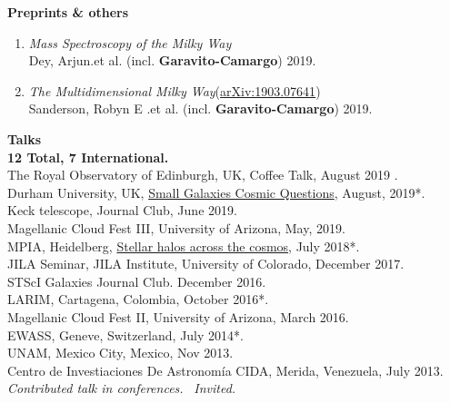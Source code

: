 \documentclass[UTF8]{article}
\begin{document}
{\Large \textbf{Preprints \& others}}\\

\begin{enumerate}
\item \textit{Mass Spectroscopy of the Milky Way} \\
  Dey, Arjun.et al. (incl. \textbf{Garavito-Camargo}) 2019.\\

\item \textit{The Multidimensional Milky Way}(\href{https://arxiv.org/abs/1909.07641}{arXiv:1903.07641}) \\
  Sanderson, Robyn E .et al. (incl. \textbf{Garavito-Camargo}) 2019.\\
\end{enumerate}

{\Large \textbf{Talks}}\\


\indent \indent \textbf{12 Total, 7 International.}\\
\indent\indent The Royal Observatory of Edinburgh, UK, Coffee Talk, August 2019 \dag.\\
\indent\indent Durham University, UK, \href{http://astro.dur.ac.uk/cosmodwarfs/}{Small Galaxies Cosmic Questions}, August, 2019*.\\
\indent\indent Keck telescope, Journal Club, June 2019.\\
\indent\indent Magellanic Cloud Fest III, University of Arizona, May, 2019.\\
\indent\indent MPIA, Heidelberg, \href{http://www.mpia.de/homes/stellarhalos2018-loc/sh2018/index.html}{Stellar halos across the cosmos}, July 2018*.\\
\indent\indent JILA Seminar, JILA Institute, University of Colorado, December 2017.\\
\indent\indent STScI Galaxies Journal Club. December 2016.\\
\indent\indent LARIM, Cartagena, Colombia, October 2016*.\\
\indent\indent Magellanic Cloud Fest II, University of Arizona, March 2016.\\
\indent\indent EWASS, Geneve, Switzerland, July 2014*.\\
\indent\indent UNAM, Mexico City, Mexico, Nov 2013. \\
\indent\indent Centro de Investiaciones De Astronom\'ia CIDA, Merida, Venezuela, July 2013.\\

\indent\indent * \textit{Contributed talk in conferences.}
\indent\indent\ \dag \textit{Invited.} \\
\end{document}
